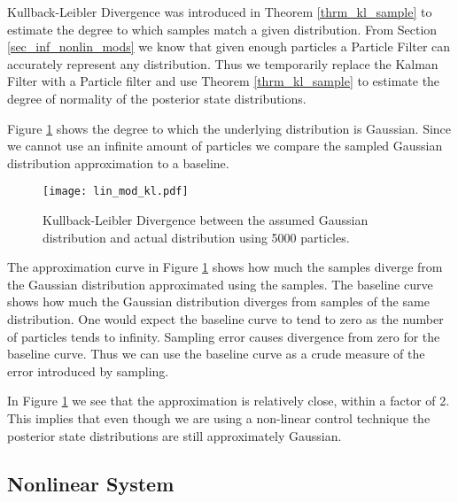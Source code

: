 Kullback-Leibler Divergence was introduced in Theorem \ref{thrm_kl_sample} to estimate the degree to which samples match a given distribution. From Section \ref{sec_inf_nonlin_mods} we know that given enough particles a Particle Filter can accurately represent any distribution. Thus we temporarily replace the Kalman Filter with a Particle filter and use Theorem \ref{thrm_kl_sample} to estimate the degree of normality of the posterior state distributions.

Figure \ref{fig_lin_mod_kl} shows the degree to which the underlying distribution is Gaussian. Since we cannot use an infinite amount of particles we compare the sampled Gaussian distribution approximation to a baseline.   
\begin{figure}[H] 
\centering
\texttt{[image: lin\_mod\_kl.pdf]}
\caption{Kullback-Leibler Divergence between the assumed Gaussian distribution and actual distribution using 5000 particles.}
\label{fig_lin_mod_kl}
\end{figure}
The approximation curve in Figure \ref{fig_lin_mod_kl} shows how much the samples diverge from the Gaussian distribution approximated using the samples. The baseline curve shows how much the Gaussian distribution diverges from samples of the same distribution. One would expect the baseline curve to tend to zero as the number of particles tends to infinity. Sampling error causes divergence from zero for the baseline curve. Thus we can use the baseline curve as a crude measure of the  error introduced by sampling.

In Figure \ref{fig_lin_mod_kl} we see that the approximation is relatively close, within a factor of 2. This implies that even though we are using a non-linear control technique the posterior state distributions are still approximately Gaussian. 


\subsection{Nonlinear System}



